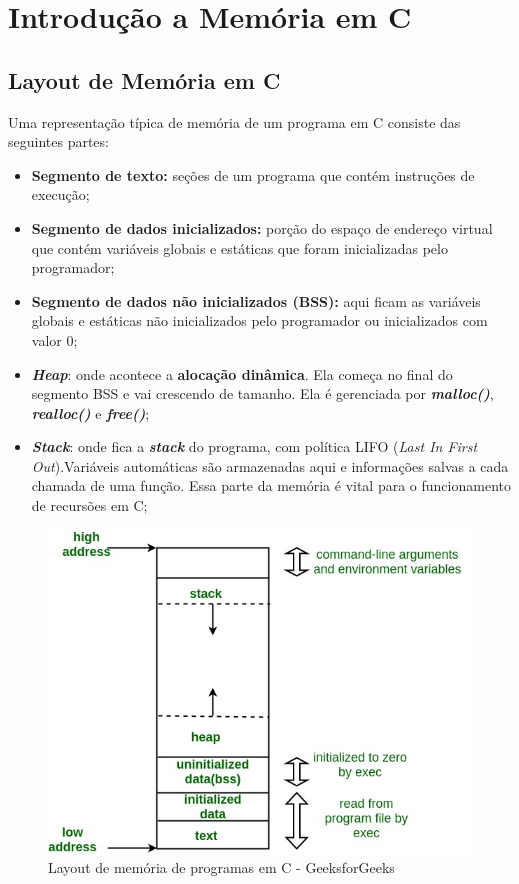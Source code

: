 \section{Introdução a Memória em C}

\subsection{Layout de Memória em C}

Uma representação típica de memória de um programa em C consiste das seguintes partes:
\begin{itemize}
  \item \textbf{Segmento de texto:} seções de um programa que contém instruções de execução;
  \item \textbf{Segmento de dados inicializados:} porção do espaço de endereço virtual que contém
    variáveis globais e estáticas que foram inicializadas pelo programador;
  \item \textbf{Segmento de dados não inicializados (BSS):} aqui ficam as variáveis globais e
    estáticas não inicializados pelo programador ou inicializados com valor 0;
  \item \textbf{\textit{Heap}}: onde acontece a \textbf{alocação dinâmica}. Ela começa no final do segmento BSS e vai
    crescendo de tamanho. Ela é gerenciada por \textbf{\textit{malloc()}}, \textbf{\textit{realloc()}} e \textbf{\textit{free()}};
  \item \textbf{\textit{Stack}}: onde fica a \textbf{\textit{stack}} do programa, com política LIFO (\textit{Last In First
    Out}).Variáveis automáticas são armazenadas aqui e informações salvas a cada chamada de uma
    função. Essa parte da memória é vital para o funcionamento de recursões em C;
\end{itemize}

\begin{figure}[H]
  \includegraphics[scale=0.5]{assets/memory-layout-c.jpeg}
  \centering
  \caption{Layout de memória de programas em C - GeeksforGeeks}
\end{figure}

